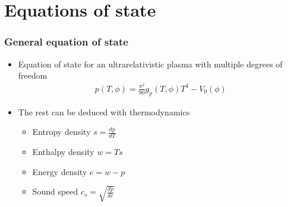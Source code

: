\section{Equations of state}

\begin{frame}
    \frametitle{General equation of state}
    \begin{itemize}
        \item Equation of state for an ultrarelativistic plasma with multiple degrees of freedom
        \begin{align}
            p(T,\phi) = \frac{\pi^2}{90} g_p(T,\phi) T^4 - V_0(\phi)
        \end{align}
        \item The rest can be deduced with thermodynamics
        \begin{itemize}
            \item Entropy density $s = \frac{dp}{dT}$
            \item Enthalpy density $w = Ts$
            \item Energy density $e = w - p$
            \item Sound speed $c_s = \sqrt{\frac{dp}{de}}$
        \end{itemize}
    \end{itemize}
\end{frame}

